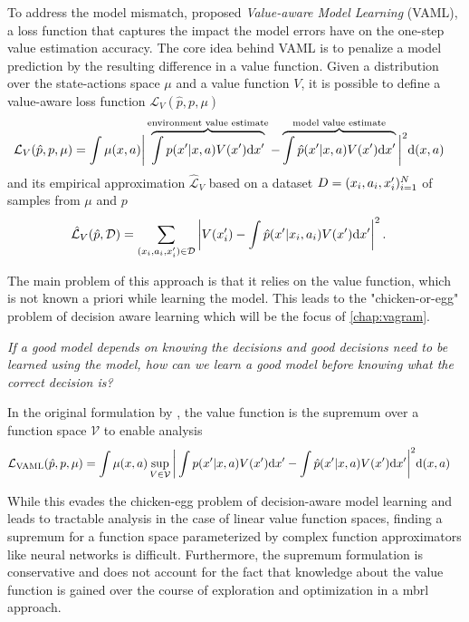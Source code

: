 To address the model mismatch, \textcite{vaml} proposed \emph{Value-aware Model Learning} (VAML), a loss function that captures the impact the model errors have on the one-step value estimation accuracy.
The core idea behind VAML is to penalize a model prediction by the resulting difference in a value function. Given a distribution over the state-actions space $\mu$ and a value function $V$, it is possible to define a value-aware loss function $\mathcal{L}_V(\hat{p}, p, \mu)$
\begin{align}
    &\mathcal{L}_V(\hat{p}, p, \mu) = \int \mu(x,a) \bigg|\overbrace{\int p(x'|x,a)V(x')\mathrm{d}x'}^{\text{environment value estimate}}  - \overbrace{\int \hat{p}(x'|x,a) V(x') \mathrm{d}x'}^{\text{model value estimate}}\bigg|^2 \mathrm{d} (x,a)
\end{align}
and its empirical approximation $\hat{\mathcal{L}}_V$ based on a dataset $D = (x_i,a_i,x'_i)_{i=1}^N$ of samples from $\mu$ and $p$
\begin{align}
    &\hat{\mathcal{L}}_V(\hat{p}, \mathcal{D}) = \sum_{(x_i,a_i,x'_i)\in\mathcal{D}} \left|V(x'_i) - \int \hat{p}(x'|x_i,a_i) V(x') \mathrm{d} x'\right|^2\label{eq:background:IterVAMLloss}.
\end{align}

The main problem of this approach is that it relies on the value function, which is not known a priori while learning the model. 
This leads to the "chicken-or-egg" problem of decision aware learning which will be the focus of \autoref{chap:vagram}.

\emph{If a good model depends on knowing the decisions and good decisions need to be learned using the model, how can we learn a good model before knowing what the correct decision is?}

In the original formulation by \textcite{vaml}, the value function is the supremum over a function space $\mathcal{V}$ to enable analysis
\begin{align}
    &\mathcal{L}_\text{VAML}(\hat{p}, p, \mu) = \int \mu(x,a) \sup_{V\in \mathcal{V}}\bigg|\int p(x'|x,a)V(x')\mathrm{d}x'  - \int \hat{p}(x'|x,a) V(x') \mathrm{d}x'\bigg|^2 \mathrm{d} (x,a)
\end{align}

While this evades the chicken-egg problem of decision-aware model learning and leads to tractable analysis in the case of linear value function spaces, finding a supremum for a function space parameterized by complex function approximators like neural networks is difficult.
Furthermore, the supremum formulation is conservative and does not account for the fact that knowledge about the value function is gained over the course of exploration and optimization in a \ac{mbrl} approach.


